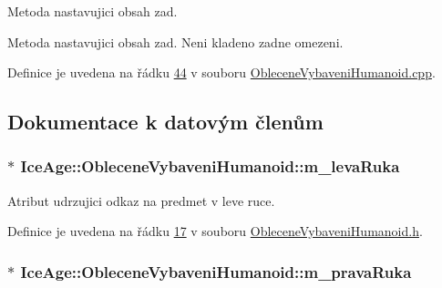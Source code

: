 Metoda nastavujici obsah zad. 

Metoda nastavujici obsah zad. Neni kladeno zadne omezeni. 

Definice je uvedena na řádku \hyperlink{ObleceneVybaveniHumanoid_8cpp_source_l00044}{44} v souboru \hyperlink{ObleceneVybaveniHumanoid_8cpp_source}{Oblecene\+Vybaveni\+Humanoid.\+cpp}.



\subsection{Dokumentace k datovým členům}
\subsubsection[{\texorpdfstring{m\+\_\+leva\+Ruka}{m_levaRuka}}]{$\ast$ Ice\+Age\+::\+Oblecene\+Vybaveni\+Humanoid\+::m\+\_\+leva\+Ruka\hspace{0.3cm}{\ttfamily [protected]}}\hypertarget{classIceAge_1_1ObleceneVybaveniHumanoid_aab35aa50c2707e31f7f86509d75aed32}{}\label{classIceAge_1_1ObleceneVybaveniHumanoid_aab35aa50c2707e31f7f86509d75aed32}


Atribut udrzujici odkaz na predmet v leve ruce. 



Definice je uvedena na řádku \hyperlink{ObleceneVybaveniHumanoid_8h_source_l00017}{17} v souboru \hyperlink{ObleceneVybaveniHumanoid_8h_source}{Oblecene\+Vybaveni\+Humanoid.\+h}.

\subsubsection[{\texorpdfstring{m\+\_\+prava\+Ruka}{m_pravaRuka}}]{$\ast$ Ice\+Age\+::\+Oblecene\+Vybaveni\+Humanoid\+::m\+\_\+prava\+Ruka\hspace{0.3cm}{\ttfamily [protected]}}\hypertarget{classIceAge_1_1ObleceneVybaveniHumanoid_aff9f64fece90fb80a02896126120c933}{}\label{classIceAge_1_1ObleceneVybaveniHumanoid_aff9f64fece90fb80a02896126120c933}


